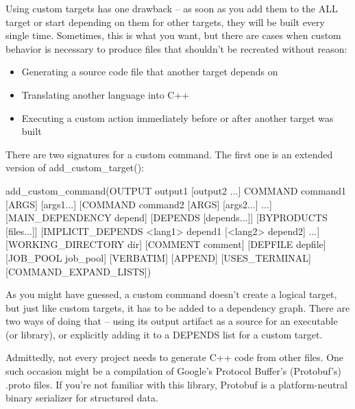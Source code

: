 
Using custom targets has one drawback – as soon as you add them to the ALL target or start depending on them for other targets, they will be built every single time. Sometimes, this is what you want, but there are cases when custom behavior is necessary to produce files that shouldn’t be recreated without reason:

\begin{itemize}
\item
Generating a source code file that another target depends on

\item
Translating another language into C++

\item
Executing a custom action immediately before or after another target was built
\end{itemize}

There are two signatures for a custom command. The first one is an extended version of add\_custom\_target():

\begin{shell}
add_custom_command(OUTPUT output1 [output2 ...]
                   COMMAND command1 [ARGS] [args1...]
                   [COMMAND command2 [ARGS] [args2...] ...]
                   [MAIN_DEPENDENCY depend]
                   [DEPENDS [depends...]]
                   [BYPRODUCTS [files...]]
                   [IMPLICIT_DEPENDS <lang1> depend1
                                    [<lang2> depend2] ...]
                   [WORKING_DIRECTORY dir]
                   [COMMENT comment]
                   [DEPFILE depfile]
                   [JOB_POOL job_pool]
                   [VERBATIM] [APPEND] [USES_TERMINAL]
                   [COMMAND_EXPAND_LISTS])
\end{shell}

As you might have guessed, a custom command doesn’t create a logical target, but just like custom targets, it has to be added to a dependency graph. There are two ways of doing that – using its output artifact as a source for an executable (or library), or explicitly adding it to a DEPENDS list for a custom target.


Admittedly, not every project needs to generate C++ code from other files. One such occasion might be a compilation of Google’s Protocol Buffer’s (Protobuf’s) .proto files. If you’re not familiar with this library, Protobuf is a platform-neutral binary serializer for structured data.


